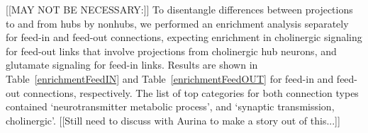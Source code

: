 \documentclass[10pt,letterpaper]{article}
\newlength\savedwidth
\newcommand\thickhline{\noalign{\global\savedwidth\arrayrulewidth\global\arrayrulewidth 2pt}%
\hline
\noalign{\global\arrayrulewidth\savedwidth}}
\begin{document}
[[MAY NOT BE NECESSARY:]]
To disentangle differences between projections to and from hubs by nonhubs, we performed an enrichment analysis separately for feed-in and feed-out connections, expecting enrichment in cholinergic signaling for feed-out links that involve projections from cholinergic hub neurons, and glutamate signaling for feed-in links.
Results are shown in Table~\ref{enrichmentFeedIN} and Table~\ref{enrichmentFeedOUT} for feed-in and feed-out connections, respectively.
The list of top categories for both connection types contained `neurotransmitter metabolic process', and `synaptic transmission, cholinergic'.
[[Still need to discuss with Aurina to make a story out of this...]]




\end{document}

